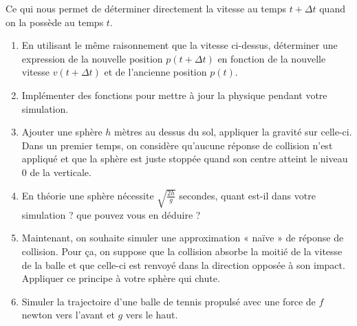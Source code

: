 \documentclass[a4paper,12pt]{article}
\begin{document}
Ce qui nous permet de déterminer directement la vitesse au temps $t+\Delta t$ quand on la possède au temps $t$. 


\begin{enumerate}
    \item En utilisant le même raisonnement que la vitesse ci-dessus, déterminer une expression de la nouvelle position $p(t+\Delta t)$ en fonction de la nouvelle vitesse $v(t+\Delta t)$ et de l'ancienne position $p(t)$.  
    \item Implémenter des fonctions pour mettre à jour la physique pendant votre simulation.
    \item Ajouter une sphère $h$ mètres au dessus du sol, appliquer la gravité sur celle-ci. Dans un premier temps, on considère qu'aucune réponse de collision n'est appliqué et que la sphère est juste stoppée quand son centre atteint le niveau $0$ de la verticale. 
    \item En théorie une sphère nécessite $\sqrt{\frac{2h}{g}}$ secondes, quant est-il dans votre simulation ? que pouvez vous en déduire ?
    \item Maintenant, on souhaite simuler une approximation « naïve » de réponse de collision. Pour ça, on suppose que la collision absorbe la moitié de la vitesse de la balle et que celle-ci est renvoyé dans la direction opposée à son impact. Appliquer ce principe à votre sphère qui chute.
    \item Simuler la trajectoire d'une balle de tennis propulsé avec une force de $f$ newton vers l'avant et $g$ vers le haut.
\end{enumerate}
\end{document}
